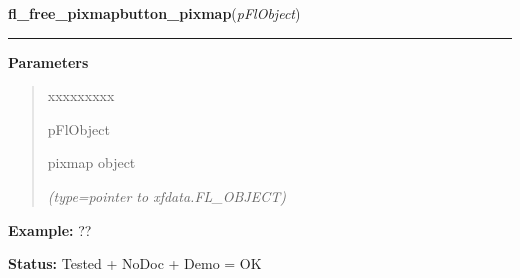 \hspace{.8\funcindent}\begin{boxedminipage}{\funcwidth}

    \raggedright \textbf{fl\_free\_pixmapbutton\_pixmap}(\textit{pFlObject})

    \vspace{-1.5ex}

    \rule{\textwidth}{0.5\fboxrule}
\setlength{\parskip}{2ex}
\setlength{\parskip}{1ex}
      \textbf{Parameters}
      \vspace{-1ex}

      \begin{quote}
        \begin{Ventry}{xxxxxxxxx}

          \item[pFlObject]

          pixmap object

            {\it (type=pointer to xfdata.FL\_OBJECT)}

        \end{Ventry}

      \end{quote}

\textbf{Example:} ??



\textbf{Status:} Tested + NoDoc + Demo = OK



    \end{boxedminipage}

    \label{xformslib:flbitmap:fl_get_pixmap_pixmap}

    \vspace{0.5ex}

